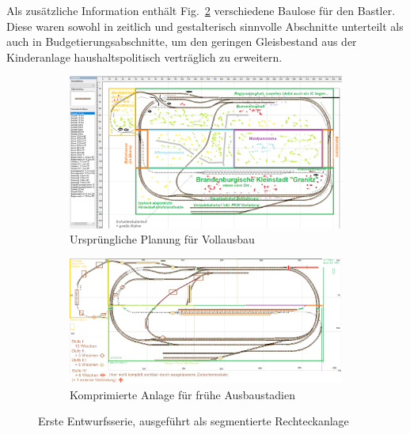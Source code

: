 Als zus\"atzliche Information enth\"alt Fig.~\ref{img:state0-1_granitz_modules_compressed} verschiedene Baulose f\"ur den Bastler.
Diese waren sowohl in zeitlich und gestalterisch sinnvolle Abschnitte unterteilt als auch in Budgetierungsabschnitte, um den geringen Gleisbestand aus der Kinderanlage haushaltspolitisch vertr\"aglich zu erweitern.

\begin{figure}[h]
\centering
	\begin{subfigure}[b]{1.0\textwidth}
    \includegraphics[width=1.0\textwidth]{img/map_evolution/state0-1_granitz_modules_details.png}
   \caption{Urspr\"ungliche Planung f\"ur Vollausbau}
    \label{img:state0-1_granitz_modules_details}
    \end{subfigure}
	\begin{subfigure}[b]{1.0\textwidth}
    \includegraphics[width=1.0\textwidth]{img/map_evolution/state0-1_granitz_modules_compressed.png}
   \caption{Komprimierte Anlage f\"ur fr\"uhe Ausbaustadien}
    \label{img:state0-1_granitz_modules_compressed}
    \end{subfigure}
	\label{img:state0-1_granitz}
	\caption{Erste Entwurfsserie, ausgef\"uhrt als segmentierte Rechteckanlage}
\end{figure}


